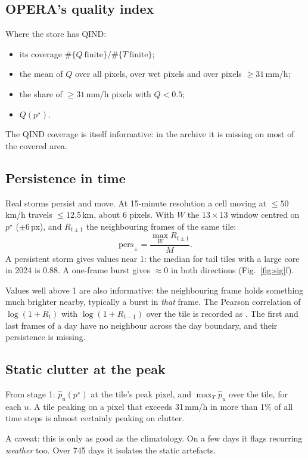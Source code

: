 \documentclass[11pt,a4paper]{article}
\theoremstyle{definition}
\theoremstyle{remark}
\newcommand{\1}{\mathbf{1}}
\newcommand{\code}[1]{\texttt{\detokenize{#1}}}
\begin{document}
\subsection{OPERA's quality index}
Where the store has QIND:
\begin{itemize}[nosep]
\item its coverage $\#\{Q\ \text{finite}\}/\#\{T\ \text{finite}\}$;
\item the mean of $Q$ over all pixels, over wet pixels and over pixels $\ge31$\,mm/h;
\item the share of $\ge31$\,mm/h pixels with $Q<0.5$;
\item $Q(p^\star)$.
\end{itemize}
The QIND coverage is itself informative: in the archive it is missing on most of the covered
area.

\subsection{Persistence in time}
Real storms persist and move. At 15-minute resolution a cell moving at $\le50$\,km/h
travels $\le12.5$\,km, about 6 pixels. With $W$ the $13\times13$ window centred on $p^\star$
($\pm6$\,px), and $R_{t\pm1}$ the neighbouring frames of the same tile:
\begin{equation}
  \mathrm{pers}_{\pm}=\frac{\max_{W}R_{t\pm1}}{M}.
\end{equation}
A persistent storm gives values near 1: the median for tail tiles with a large core in 2024
is $0.88$. A one-frame burst gives $\approx0$ in both directions (Fig.~\ref{fig:sig}f).

Values well above 1 are also informative: the neighbouring frame holds something much
brighter nearby, typically a burst in \emph{that} frame. The Pearson correlation of
$\log(1+R_t)$ with $\log(1+R_{t-1})$ over the tile is recorded as \code{corr_prev}. The first
and last frames of a day have no neighbour across the day boundary, and their persistence is
missing.

\subsection{Static clutter at the peak}\label{sec:featclim}
From stage 1: $\hat p_u(p^\star)$ at the tile's peak pixel, and $\max_T\hat p_u$ over the
tile, for each $u$. A tile peaking on a pixel that exceeds 31\,mm/h in more than 1\% of all
time steps is almost certainly peaking on clutter.

A caveat: this is only as good as the climatology. On a few days it flags recurring
\emph{weather} too. Over 745 days it isolates the static artefacts.
\end{document}
